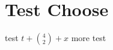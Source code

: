 \documentclass[10pt]{article}
\begin{document}
\section{Test Choose}
test $t + {4\choose 2} + x$ more test
\end{document}
